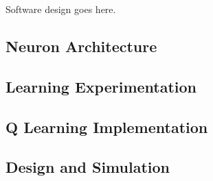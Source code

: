 Software design goes here.

\subsection{Neuron Architecture}

\subsection{Learning Experimentation}


\subsection{Q Learning Implementation}

\subsection{Design and Simulation}
